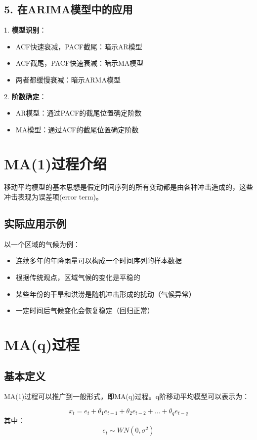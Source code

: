\subsection{5. 在ARIMA模型中的应用}

1. \textbf{模型识别}：
\begin{itemize}
    \item ACF快速衰减，PACF截尾：暗示AR模型
    \item ACF截尾，PACF快速衰减：暗示MA模型
    \item 两者都缓慢衰减：暗示ARMA模型
\end{itemize}

2. \textbf{阶数确定}：
\begin{itemize}
    \item AR模型：通过PACF的截尾位置确定阶数
    \item MA模型：通过ACF的截尾位置确定阶数
\end{itemize}



\section{MA(1)过程介绍}
移动平均模型的基本思想是假定时间序列的所有变动都是由各种冲击造成的，这些冲击表现为误差项(error term)。

\subsection{实际应用示例}
以一个区域的气候为例：
\begin{itemize}
    \item 连续多年的年降雨量可以构成一个时间序列的样本数据
    \item 根据传统观点，区域气候的变化是平稳的
    \item 某些年份的干旱和洪涝是随机冲击形成的扰动（气候异常）
    \item 一定时间后气候变化会恢复稳定（回归正常）
\end{itemize}

\section{MA(q)过程}
\subsection{基本定义}
MA(1)过程可以推广到一般形式，即MA(q)过程。q阶移动平均模型可以表示为：

\[x_t = e_t + \theta_1e_{t-1} + \theta_2e_{t-2} + ... + \theta_qe_{t-q}\]
其中：\[e_t \sim WN(0,\sigma^2)\]

